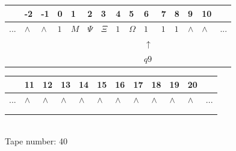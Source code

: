 \documentclass[11pt]{article}
\begin{document}
\begin{table}[H]
\centering
\begin{tabular}{lllllllllllllll}
 & -2 & -1 & 0 & 1 & 2 & 3 & 4 & 5 & 6 & 7 & 8 & 9 & 10 & \\
\hline
$...$ & \multicolumn{1}{|l|}{$\wedge$} & \multicolumn{1}{|l|}{$\wedge$} & \multicolumn{1}{|l|}{$1$} & \multicolumn{1}{|l|}{$M$} & \multicolumn{1}{|l|}{$\Psi$} & \multicolumn{1}{|l|}{$\Xi$} & \multicolumn{1}{|l|}{$1$} & \multicolumn{1}{|l|}{$\Omega$} & \multicolumn{1}{|l|}{$1$} & \multicolumn{1}{|l|}{$1$} & \multicolumn{1}{|l|}{$1$} & \multicolumn{1}{|l|}{$\wedge$} & \multicolumn{1}{|l|}{$\wedge$} & $...$\\
\hline
&  &  &  &  &  &  &  &  & $\uparrow$ &  &  &  &  &  \\
&  &  &  &  &  &  &  &  & $ q9 $ &  &  &  &  &  \\
\end{tabular}
\begin{tabular}{llllllllllll}
 & 11 & 12 & 13 & 14 & 15 & 16 & 17 & 18 & 19 & 20 & \\
\hline
$...$ & \multicolumn{1}{|l|}{$\wedge$} & \multicolumn{1}{|l|}{$\wedge$} & \multicolumn{1}{|l|}{$\wedge$} & \multicolumn{1}{|l|}{$\wedge$} & \multicolumn{1}{|l|}{$\wedge$} & \multicolumn{1}{|l|}{$\wedge$} & \multicolumn{1}{|l|}{$\wedge$} & \multicolumn{1}{|l|}{$\wedge$} & \multicolumn{1}{|l|}{$\wedge$} & \multicolumn{1}{|l|}{$\wedge$} & $...$\\
\hline
&  &  &  &  &  &  &  &  &  &  &  \\
&  &  &  &  &  &  &  &  &  &  &  \\
\end{tabular}
\\
Tape number: 40
\noindent\makebox[\linewidth]{\hdashrule{\textwidth}{1pt}{1pt}}\end{table}
\end{document}
